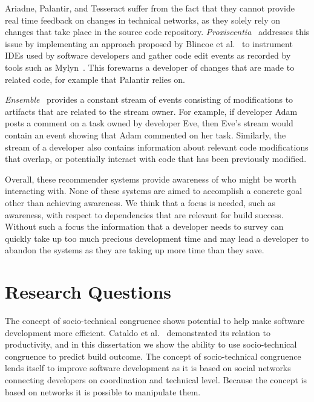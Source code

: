 Ariadne, Palantir, and Tesseract suffer from the fact that they cannot provide real time feedback on changes in  technical networks, as they solely rely on changes that take place in the source code repository. 
\emph{Proxiscentia}~\cite{borici:chase:2012} addresses this issue by implementing an approach proposed by Blincoe et al.~\cite{blincoe:cscw:2012} to instrument IDEs used by software developers and gather code edit events as recorded by tools such as Mylyn~\cite{kersten:aosd:2005}.
This forewarns a developer of changes that are made to related code, for example that Palantir relies on.

\emph{Ensemble}~\cite{xiang:rsse:2008} provides a constant stream of events consisting of modifications to artifacts that are related to the stream owner.
For example, if developer Adam posts a comment on a task owned by developer Eve, then Eve's stream would contain an event showing that Adam commented on her task.
Similarly, the stream of a developer also contains information about relevant code modifications that overlap, or potentially interact with code that has been previously modified.

Overall, these recommender systems provide awareness of who might be worth interacting with.
None of these systems are aimed to accomplish a concrete goal other than achieving awareness.
We think that a focus is needed, such as awareness, with respect to dependencies that are relevant for build success.
Without such a focus the information that a developer needs to survey can quickly take up too much precious development time and may lead a developer to abandon the systems as they are taking up more time than they save.


\section{Research Questions}
The concept of socio-technical congruence shows potential to help make software development more efficient.
Cataldo et al.~\cite{cataldo:cscw:2006} demonstrated its relation to productivity, and in this dissertation we show the ability to use socio-technical congruence to predict build outcome.
The concept of socio-technical congruence lends itself to improve software development as it is based on social networks connecting developers on coordination and technical level.
Because the concept is based on networks it is possible to manipulate them.

